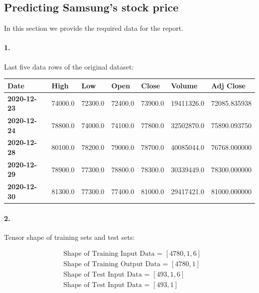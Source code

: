 \documentclass[12pt]{article}
\begin{document}
\subsection{Predicting Samsung's stock price}
In this section we provide the required data for the report.

\paragraph{1.} Last five data rows of the original dataset:
\begin{center}
\begin{tabular}{  l  l  l  l  l  l  l }
    \rowcolor{gray!50}
    \textbf{Date} & \textbf{High} & \textbf{Low} & \textbf{Open} & \textbf{Close} & \textbf{Volume} & \textbf{Adj Close}\\
    \hline
    \textbf{2020-12-23} & 74000.0 & 72300.0 & 72400.0 & 73900.0 & 19411326.0 & 72085.835938\\
    \textbf{2020-12-24} & 78800.0 & 74000.0 & 74100.0 & 77800.0 & 32502870.0 & 75890.093750\\
    \textbf{2020-12-28} & 80100.0 & 78200.0 & 79000.0 & 78700.0 & 40085044.0 & 76768.000000\\
    \textbf{2020-12-29} & 78900.0 & 77300.0 & 78800.0 & 78300.0 & 30339449.0 & 78300.000000\\
    \textbf{2020-12-30} & 81300.0 & 77300.0 & 77400.0 & 81000.0 & 29417421.0 & 81000.000000\\
\end{tabular}
\end{center}

\paragraph{2.} Tensor shape of training sets and test sets:

\begin{equation}
    \begin{aligned}
    &\text{Shape of Training Input Data =  } [4780, 1, 6]\\
    &\text{Shape of Training Output Data =  } [4780, 1]\\
    &\text{Shape of Test Input Data =  } [493, 1, 6]\\
    &\text{Shape of Test Input Data =  } [493, 1]\\
    \end{aligned}
\end{equation}
\end{document}
